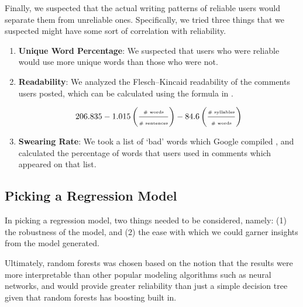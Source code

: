Finally, we suspected that the actual writing patterns of reliable users would
separate them from unreliable ones. Specifically, we tried three things that we
suspected might have some sort of correlation with reliability.

\begin{enumerate}
    \item \textbf{Unique Word Percentage}: We suspected that users who were
    reliable would use more unique words than those who were not.

    \item \textbf{Readability}: We analyzed the Flesch--Kincaid readability
    \cite{kincaid1975derivation} of the comments users posted, which can be
    calculated using the formula in .

    \begin{equation} \label{eq:fk_eq}
        206.835 - 1.015 \left(\frac{\text{\tiny \# words}}{\text{\tiny \# sentences}}\right) - 84.6 \left(\frac{\text{\tiny \# syllables}}{\text{\tiny \# words}}\right)
    \end{equation}

    \item \textbf{Swearing Rate}: We took a list of `bad' words which Google
    compiled \cite{googlebadwords}, and calculated the percentage of words that
    users used in comments which appeared on that list.

\end{enumerate}





\subsection{Picking a Regression Model} %
\label{sub:picking_a_regression_model}

In picking a regression model, two things needed to be considered, namely: (1)
the robustness of the model, and (2) the ease with which we could garner
insights from the model generated.

Ultimately, random forests \cite{598994} was chosen based on the notion that the
results were more interpretable than other popular modeling algorithms such as
neural networks, and would provide greater reliability than just a simple
decision tree given that random forests has boosting built in.

